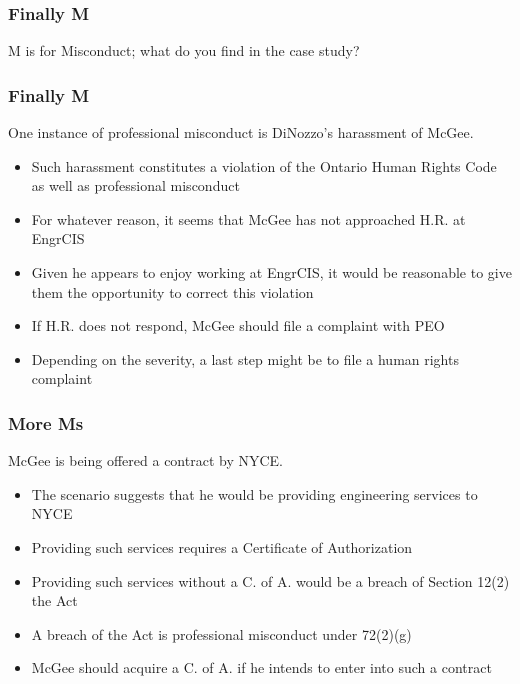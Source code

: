 \begin{frame}
\frametitle{Finally M}

M is for Misconduct; what do you find in the case study?

\end{frame}




\begin{frame}
\frametitle{Finally M}

One instance of professional misconduct is DiNozzo's harassment of McGee.

\begin{itemize}
\item Such harassment constitutes a violation of the
Ontario Human Rights Code as well as professional
misconduct
\item For whatever reason, it seems that McGee
has not approached H.R. at EngrCIS
\item Given he appears to enjoy working at EngrCIS,
it would be reasonable to give them the
opportunity to correct this violation
\item If H.R. does not respond, McGee should
file a complaint with PEO
\item Depending on the severity, a last step might
be to file a human rights complaint
\end{itemize}

\end{frame}



\begin{frame}
\frametitle{More Ms}

McGee is being offered a contract by NYCE.
\begin{itemize}
\item The scenario suggests that he would be
providing engineering services to NYCE
\item Providing such services requires a Certificate of Authorization
\item Providing such services without a C. of A.
would be a breach of Section 12(2) the Act
\item A breach of the Act is professional misconduct
under 72(2)(g)
\item McGee should acquire a C. of A. if he intends
to enter into such a contract
\end{itemize}

\end{frame}



